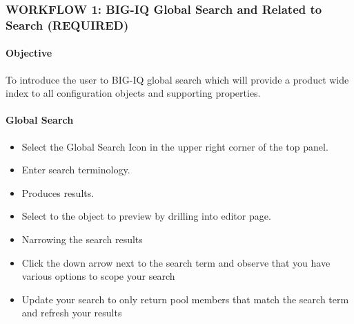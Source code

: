 \documentclass[letterpaper,10pt,english]{sphinxmanual}
\begin{document}
\subsubsection{WORKFLOW 1: BIG-IQ Global Search and Related to Search (REQUIRED)}
\label{\detokenize{class1/module4/lab5:workflow-1-big-iq-global-search-and-related-to-search-required}}

\paragraph{Objective}
\label{\detokenize{class1/module4/lab5:objective}}
To introduce the user to BIG-IQ global search which will provide a
product wide index to all configuration objects and supporting
properties.


\paragraph{Global Search}
\label{\detokenize{class1/module4/lab5:global-search}}\begin{itemize}
\item {} 
Select the Global Search Icon in the upper right corner of the top
panel.


\item {} 
Enter search terminology.


\item {} 
Produces results.

\item {} 
Select to the object to preview by drilling into editor page.


\item {} 
Narrowing the search results

\item {} 
Click the down arrow next to the search term and observe that you
have various options to scope your search

\item {} 
Update your search to only return pool members that match the
search term and refresh your results


\end{itemize}
\end{document}
